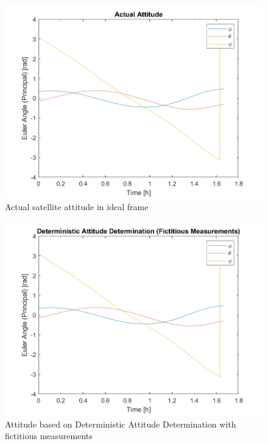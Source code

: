 \begin{figure}[H]
\centering
\includegraphics[scale=0.7]{Images/ps6_problem6_actual.png}
\caption{Actual satellite attitude in ideal frame}
\label{fig:Images/ps6_problem6_actual}
\end{figure}

\begin{figure}[H]
\centering
\includegraphics[scale=0.7]{Images/ps6_problem6_DADFict.png}
\caption{Attitude based on Deterministic Attitude Determination with fictitious measurements}
\label{fig:Images/ps6_problem6_DADFict}
\end{figure}

